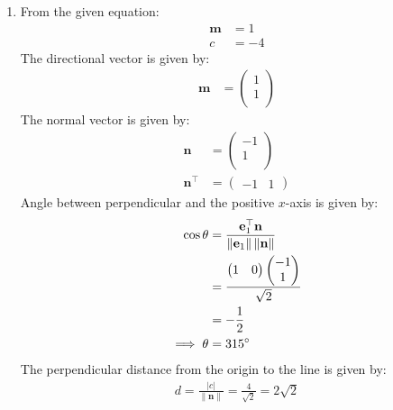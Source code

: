 \documentclass[12pt]{article}
\providecommand{\norm}[1]{\left\lVert#1\right\rVert}
\newcommand{\myvec}[1]{\ensuremath{\begin{pmatrix}#1\end{pmatrix}}}
\let\vec\mathbf
\begin{document}
\begin{enumerate}
\begin{figure}[H]
\begin{center}
	\end{center}
\caption{}
\label{fig:Fig2}
\end{figure}
\item From the given equation:
         \begin{align}                                    \vec{m}&=1\\                                  		c&=-4
         \end{align}                                                                                          The directional vector is given by:
          \begin{align}
                  \vec{m}&=\myvec{1\\1\\}
          \end{align}
          The normal vector is given by:
                  \begin{align}
         \vec{n}&=\myvec{-1\\1\\}\\
          \vec{n}^\top&=\myvec{-1 & 1}
                          \end{align}
          Angle between perpendicular and the positive $x$-axis is given by:
		\begin{align}   
              \cos\theta&=\frac{\vec{e}_{1}^\top\vec{n}}{\norm{\vec{e}_{1}}\norm{\vec{n}}}\\
			&=\frac{\myvec{1&0}\myvec{-1 \\ 1\\}}{\sqrt{2}}\\
			&=-\frac{1}{2}\\
			\implies	\theta&=315\degree
                \end{align}                                                                           The perpendicular distance from the origin to the line is given by:                                          \begin{align}
			d=\frac{|c|}{\norm{\vec{n}}}=\frac{4}{\sqrt{2}}=2\sqrt{2}                    
                  \end{align}
\begin{figure}[H]
	\begin{center} 

\end{center}
\end{figure}
\end{enumerate}
\end{document}
